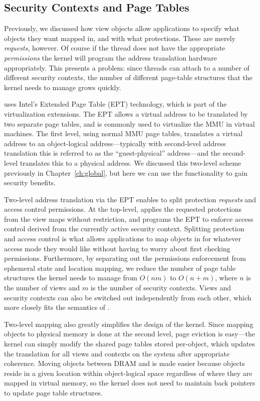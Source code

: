 \subsection{Security Contexts and Page Tables}
\label{sec:secimpl}
Previously, we discussed how view objects allow applications to specify what objects they
want mapped in, and with what protections. These are merely \emph{requests}, however. Of course if
the thread does not have the appropriate \emph{permissions} the kernel will program the address
translation hardware appropriately. This presents a problem: since threads can attach to a number of
different security contexts, the number of different page-table structures that the kernel needs to
manage grows quickly.

\clearpage
\Twizzler uses Intel's Extended Page Table (EPT) technology, which is part of the virtualization
extensions. The EPT allows a virtual address to be translated by two separate page tables, and is
commonly used to virtualize the MMU in virtual machines. The first
level, using normal MMU page tables, translates a virtual address to an object-logical
address---typically with second-level address translation this is referred to as the
``guest-physical'' address---and the second-level translates this to a physical address.
We discussed this two-level scheme previously in Chapter~\ref{ch:global}, but here we can use the functionality to
gain security benefits.

Two-level address translation via the EPT enables \Twizzler to split protection \emph{requests}
and access control permissions. At the top-level, \Twizzler applies the requested protections from
the view maps without restriction, and programs the EPT to enforce access control derived from
the currently active security context. Splitting protection and access control is what allows applications to map
objects in for whatever access mode they would like without having to worry about first checking
permissions.
Furthermore, by separating out the permissions enforcement from ephemeral state and location
mapping, we reduce the number of page table structures the kernel needs to manage
from $O\left(n m\right)$ to $O\left(n + m\right)$, where $n$ is the number of views
and $m$ is the number of security contexts. Views and security contexts can also be switched out
independently from each other, which more closely fits the semantics of \Twizzler.

Two-level mapping also greatly simplifies the design of the kernel. Since mapping objects to physical memory
is done at the second level, page eviction is easy---the kernel can simply modify the shared page
tables stored per-object, which updates the translation for all views and contexts on the system after appropriate coherence. Moving objects between DRAM and \NVM is made easier
because objects reside in a given location within object-logical space regardless of where they are
mapped in virtual memory, so the kernel does not need to maintain back pointers to update page table
structures.


